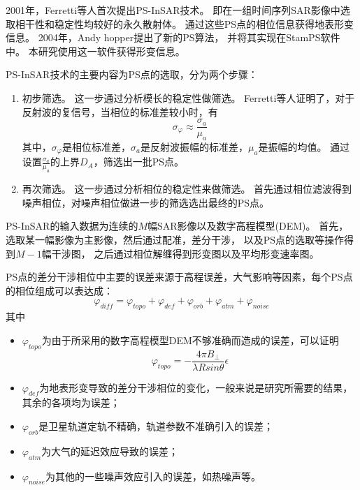 2001年，Ferretti等人首次提出PS-InSAR\cite{ferrettiNonlinearSubsidenceRate2000}技术。
即在一组时间序列SAR影像中选取相干性和稳定性均较好的永久散射体。
通过这些PS点的相位信息获得地表形变信息。
2004年，Andy hopper提出了新的PS算法\cite{hooperNewMethodMeasuring2004}，
并将其实现在StamPS软件中\cite{hooperRecentAdvancesSAR2012}。
本研究使用这一软件获得形变信息。

PS-InSAR技术的主要内容为PS点的选取，分为两个步骤：
\begin{enumerate}
    \item 初步筛选。
    这一步通过分析模长的稳定性做筛选。
    Ferretti等人证明了，对于反射波的复信号，当相位的标准差较小时，有
    \begin{equation}
        \sigma_\varphi \approx \frac{\sigma_a}{\mu_a}
    \end{equation}
    其中，$\sigma_\varphi$是相位标准差，$\sigma_a$是反射波振幅的标准差，$\mu_a$是振幅的均值。
    通过设置$\frac{\sigma_a}{\mu_a}$的上界$D_A$，筛选出一批PS点。
    \item 再次筛选。
    这一步通过分析相位的稳定性来做筛选。
    首先通过相位滤波得到噪声相位，对噪声相位做进一步的筛选选出最终的PS点。
\end{enumerate}

PS-InSAR的输入数据为连续的$M$幅SAR影像以及数字高程模型(DEM)。
首先，选取某一幅影像为主影像，然后通过配准，差分干涉，
以及PS点的选取等操作得到$M-1$幅干涉图，
之后通过相位解缠得到形变图以及平均形变速率图。

PS点的差分干涉相位中主要的误差来源于高程误差，大气影响等因素，每个PS点的相位组成可以表达成：
\begin{equation}
    \varphi_{diff}=\varphi_{topo}+\varphi_{def}+\varphi_{orb}+\varphi_{atm}+\varphi_{noise}
\end{equation}
其中
\begin{itemize}
    \item $\varphi_{topo}$为由于所采用的数字高程模型DEM不够准确而造成的误差，可以证明
    \begin{equation}
        \varphi_{topo}=-\frac{4\pi B_{\bot}}{\lambda R sin \theta}\epsilon
    \end{equation}
    \item $\varphi_{def}$为地表形变导致的差分干涉相位的变化，一般来说是研究所需要的结果，其余的各项均为误差；
    \item $\varphi_{orb}$是卫星轨道定轨不精确，轨道参数不准确引入的误差；
    \item $\varphi_{atm}$为大气的延迟效应导致的误差；
    \item $\varphi_{noise}$为其他的一些噪声效应引入的误差，如热噪声等。
\end{itemize}

